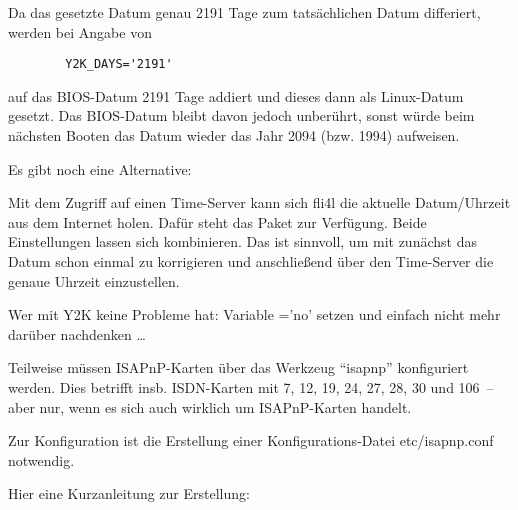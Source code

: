 \begin{description}

  Da das gesetzte Datum genau 2191 Tage zum tatsächlichen Datum differiert,
  werden bei Angabe von

\begin{example}
\begin{verbatim}
        Y2K_DAYS='2191'
\end{verbatim}
\end{example}

  auf das BIOS-Datum 2191 Tage addiert und dieses dann als Linux-Datum
  gesetzt. Das BIOS-Datum bleibt davon jedoch unberührt, sonst würde
  beim nächsten Booten das Datum wieder das Jahr 2094 (bzw. 1994) aufweisen.
\end{description}
  Es gibt noch eine Alternative:

  Mit dem Zugriff auf einen Time-Server kann sich fli4l die aktuelle
  Datum/Uhrzeit aus dem Internet holen. Dafür steht das Paket  zur
  Verfügung. Beide Einstellungen lassen sich kombinieren. Das ist
  sinnvoll, um mit  zunächst das Datum schon einmal zu
  korrigieren und anschließend über den Time-Server die genaue Uhrzeit
  einzustellen.

  Wer mit Y2K keine Probleme hat: Variable ='no' setzen und
  einfach nicht mehr darüber nachdenken \ldots



  Teilweise müssen ISAPnP-Karten über das Werkzeug ``isapnp''
  konfiguriert werden. Dies betrifft insb. ISDN-Karten mit 
  7, 12, 19, 24, 27, 28, 30 und 106~-- aber nur, wenn es sich auch wirklich um
  ISAPnP-Karten handelt.

  Zur Konfiguration ist die Erstellung einer Konfigurations-Datei
  etc/isapnp.conf notwendig.

  Hier eine Kurzanleitung zur Erstellung:

